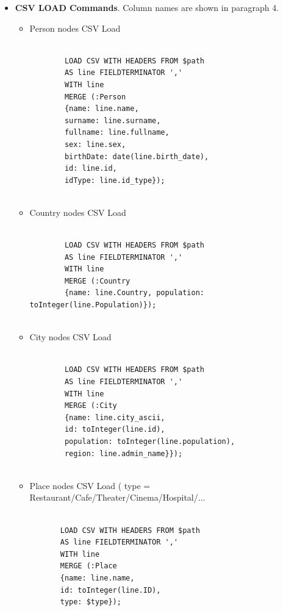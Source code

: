 \documentclass{article}[IEEEtran]
\begin{document}
\begin{itemize}
    \item \textbf{CSV LOAD Commands}. Column names are shown in paragraph 4.
    \begin{itemize}
        \item Person nodes CSV Load
        
        \begin{lstlisting}
        
        LOAD CSV WITH HEADERS FROM $path
        AS line FIELDTERMINATOR ','
        WITH line
        MERGE (:Person 
        {name: line.name, 
        surname: line.surname,
        fullname: line.fullname, 
        sex: line.sex, 
        birthDate: date(line.birth_date), 
        id: line.id, 
        idType: line.id_type});
                
        \end{lstlisting}
        
        \item Country nodes CSV Load
        
        \begin{lstlisting}
        
        LOAD CSV WITH HEADERS FROM $path
        AS line FIELDTERMINATOR ','
        WITH line
        MERGE (:Country 
        {name: line.Country, population: toInteger(line.Population)});
        
        \end{lstlisting}
        
        \item City nodes CSV Load
        
        \begin{lstlisting}
        
        LOAD CSV WITH HEADERS FROM $path
        AS line FIELDTERMINATOR ','
        WITH line
        MERGE (:City 
        {name: line.city_ascii, 
        id: toInteger(line.id), 
        population: toInteger(line.population), 
        region: line.admin_name}});  
        
       \end{lstlisting}
        
       \item Place nodes CSV Load ( type = {Restaurant/Cafe/Theater/Cinema/Hospital/...}
        
       \begin{lstlisting}
       
       LOAD CSV WITH HEADERS FROM $path
       AS line FIELDTERMINATOR ','
       WITH line
       MERGE (:Place 
       {name: line.name, 
       id: toInteger(line.ID), 
       type: $type});
        

\end{lstlisting}
\end{itemize}
\end{itemize}
\end{document}
